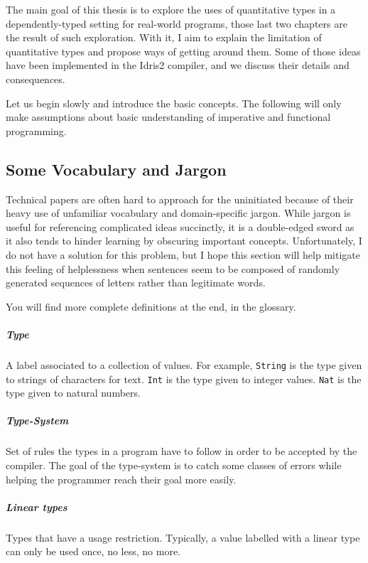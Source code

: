 \documentclass[
]{article}
\begin{document}
The main goal of this thesis is to explore the uses of quantitative
types in a dependently-typed setting for real-world programs, those last
two chapters are the result of such exploration. With it, I aim to
explain the limitation of quantitative types and propose ways of getting
around them. Some of those ideas have been implemented in the Idris2
compiler, and we discuss their details and consequences.

Let us begin slowly and introduce the basic concepts. The following will
only make assumptions about basic understanding of imperative and
functional programming.

\hypertarget{some-vocabulary-and-jargon}{%
\subsection{Some Vocabulary and
Jargon}\label{some-vocabulary-and-jargon}}

Technical papers are often hard to approach for the uninitiated because
of their heavy use of unfamiliar vocabulary and domain-specific jargon.
While jargon is useful for referencing complicated ideas succinctly, it
is a double-edged sword as it also tends to hinder learning by obscuring
important concepts. Unfortunately, I do not have a solution for this
problem, but I hope this section will help mitigate this feeling of
helplessness when sentences seem to be composed of randomly generated
sequences of letters rather than legitimate words.

You will find more complete definitions at the end, in the glossary.

\hypertarget{type}{%
\subparagraph{Type}\label{type}}

A label associated to a collection of values. For example,
\texttt{String} is the type given to strings of characters for text.
\texttt{Int} is the type given to integer values. \texttt{Nat} is the
type given to natural numbers.

\hypertarget{type-system}{%
\subparagraph{Type-System}\label{type-system}}

Set of rules the types in a program have to follow in order to be
accepted by the compiler. The goal of the type-system is to catch some
classes of errors while helping the programmer reach their goal more
easily.

\hypertarget{linear-types}{%
\subparagraph{Linear types}\label{linear-types}}

Types that have a usage restriction. Typically, a value labelled with a
linear type can only be used once, no less, no more.
\end{document}
